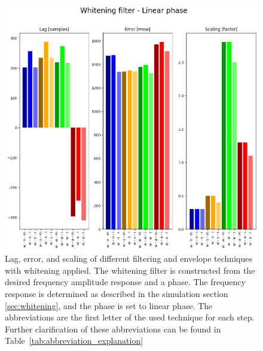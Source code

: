\begin{figure}[h!t]
	\begin{center}
		\includegraphics[width=1.0\columnwidth]{images/result_whitening_linearphase.png}
	\end{center}
	\caption{Lag, error, and scaling of different filtering and envelope techniques with whitening applied. The whitening filter is constructed from the desired frequency amplitude response and a phase. The frequency response is determined as described in the simulation section \ref{sec:whitening}, and the phase is set to linear phase. The abbreviations are the first letter of the used technique for each step. Further clarification of these abbreviations can be found in Table~\ref{tab:abbreviation_explanation}}
	\label{fig:result_whitening_linearphase}
\end{figure}

